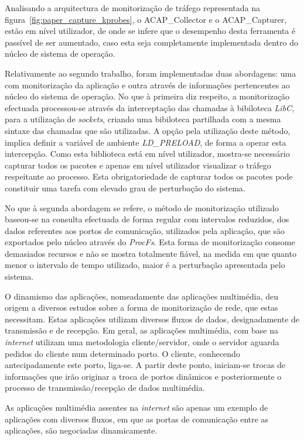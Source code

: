 Analisando a arquitectura de monitorização de tráfego representada na figura~\ref{fig:paper_capture_kprobes}, o ACAP\_Collector e o ACAP\_Capturer, estão em nível utilizador, de onde se infere que o desempenho desta ferramenta é passível de ser aumentado, caso esta seja completamente implementada dentro do núcleo de sistema de operação.

Relativamente ao segundo trabalho, foram implementadas duas abordagens: uma com monitorização da aplicação e outra através de informações pertencentes ao núcleo do sistema de operação.
No que à primeira diz respeito, a monitorização efectuada processou-se através da interceptação das chamadas à bibiloteca \textit{LibC}, para a utilização de \textit{sockets}, criando uma bibiloteca partilhada com a mesma sintaxe das chamadas que são utilizadas.
A opção pela utilização deste método, implica definir a variável de ambiente \textit{LD\_PRELOAD}, de forma a operar esta intercepção.
Como esta biblioteca está em nível utilizador, mostra-se necessário capturar todos os pacotes e apenas em nível utilizador visualizar o tráfego respeitante ao processo.
Esta obrigatoriedade de capturar todos os pacotes pode constituir uma tarefa com elevado grau de perturbação do sistema.

No que à segunda abordagem se refere, o método de monitorização utilizado baseou-se na consulta efectuada de forma regular com intervalos reduzidos, dos dados referentes aos portos de comunicação, utilizados pela aplicação, que são exportados pelo núcleo através do \textit{ProcFs}.
Esta forma de monitorização consome demasiados recursos e não se mostra totalmente fiável, na medida em que quanto menor o intervalo de tempo utilizado, maior é a perturbação apresentada pelo sistema.

O dinamismo das aplicações, nomeadamente das aplicações multimédia, deu origem a diversos estudos sobre a forma de monitorização de rede, que estas necessitam.
Estas aplicações utilizam diversos fluxos de dados, designadamente de transmissão e de recepção.
Em geral, as aplicações multimédia, com base na \textit{internet} utilizam uma metodologia cliente/servidor, onde o servidor aguarda pedidos do cliente num determinado porto.
O cliente, conhecendo antecipadamente este porto, liga-se.
A partir deste ponto, iniciam-se trocas de informações que irão originar a troca de portos dinâmicos e posteriormente o processo de transmissão/recepção de dados multimédia.

As aplicações multimédia assentes na \textit{internet} são apenas um exemplo de aplicações com diversos fluxos, em que as portas de comunicação entre as aplicações, são negociadas dinamicamente.

